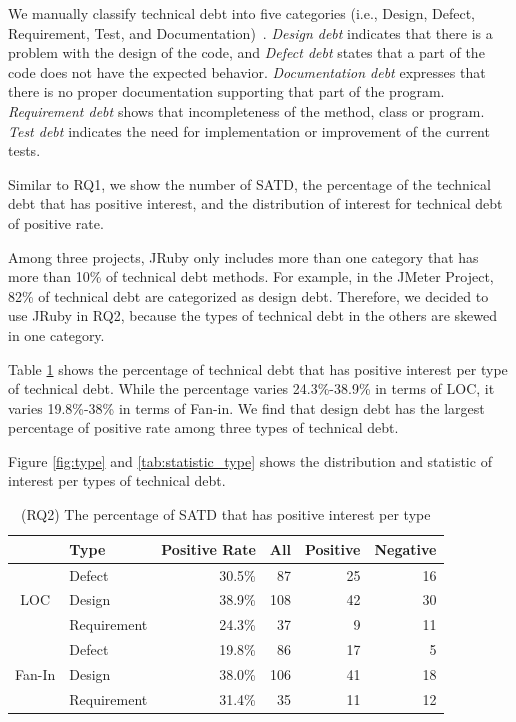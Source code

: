 We manually classify technical debt into five categories (i.e., Design, Defect, Requirement, Test, and Documentation)~\cite{Maldonado2015MTD}. {\it Design debt} indicates that there is a problem with the design of the code, and {\it Defect debt} states that a part of the code does not have the expected behavior. {\it Documentation debt} expresses that there is no proper documentation supporting that part of the program. {\it Requirement debt} shows that incompleteness of the method, class or program. {\it Test debt} indicates the need for implementation or improvement of the current tests.

Similar to RQ1, we show the number of SATD, the percentage of the technical debt that has positive interest, and the distribution of interest for technical debt of positive rate.

Among three projects, JRuby only includes more than one category that has more than 10\% of technical debt methods. For example, in the JMeter Project, 82\% of technical debt are categorized as design debt. Therefore, we decided to use JRuby in RQ2, because the types of technical debt in the others are skewed in one category.

Table \ref{tab:percentage_type} shows the percentage of technical debt that has positive interest per type of technical debt. While the percentage varies 24.3\%-38.9\% in terms of LOC, it varies 19.8\%-38\% in terms of Fan-in. We find that design debt has the largest percentage of positive rate among three types of technical debt. 

Figure \ref{fig:type} and \ref{tab:statistic_type} shows the distribution and statistic of interest per types of technical debt. 


\begin{table}[tb]
  \caption{(RQ2) The percentage of SATD that has positive interest per type}
  \label{tab:percentage_type}
  \centering

  \begin{tabular}{cl|r|rrr}
  \hline
      &  Type & Positive Rate & All & Positive & Negative \\
  \hline
        & Defect & 30.5\% &  87 &  25  &  16 \\
   LOC  & Design & 38.9\% & 108 &  42  &  30 \\
        & Requirement & 24.3\% & 37 & 9 & 11 \\
  \hline
        & Defect    & 19.8\% & 86 & 17  &   5 \\
Fan-In  & Design & 38.0\% & 106 &  41  &   18 \\
        & Requirement  & 31.4\% & 35 & 11 & 12 \\
  \hline
  \end{tabular}
\end{table}


